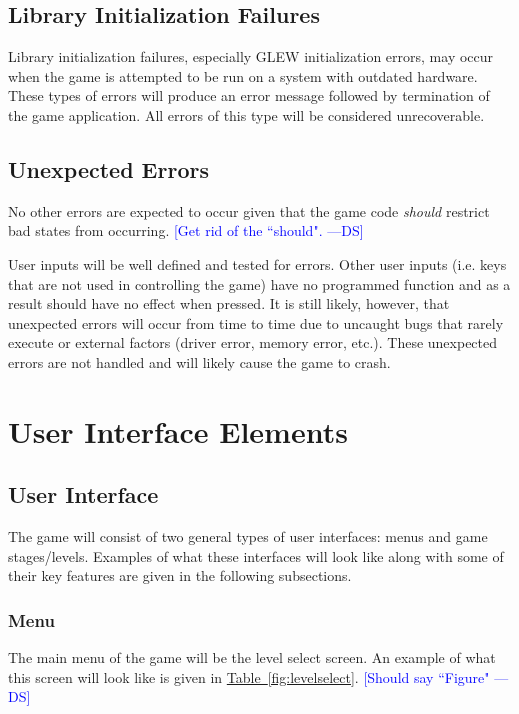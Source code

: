 \documentclass[12pt, titlepage]{article}
\newcommand{\authornote}[3]{\textcolor{#1}{[#3 ---#2]}}
\newcommand{\authornote}[3]{}
\newcommand{\ds}[1]{\authornote{blue}{DS}{#1}}
\begin{document}
\subsection{Library Initialization Failures}
Library initialization failures, especially GLEW initialization errors, may occur when the game is attempted to be run on a system with outdated hardware.  These types of errors will produce an error message followed by termination of the game application.  All errors of this type will be considered unrecoverable.

\subsection{Unexpected Errors}
No other errors are expected to occur given that the game code \emph{should} restrict bad states from occurring. 
\ds{Get rid of the ``should".}

 User inputs will be well defined and tested for errors.  Other user inputs (i.e. keys that are not used in controlling the game) have no programmed function and as a result should have no effect when pressed.  It is still likely, however, that unexpected errors will occur from time to time due to uncaught bugs that rarely execute or external factors (driver error, memory error, etc.).  These unexpected errors are not handled and will likely cause the game to crash.

\section{User Interface Elements}

\subsection{User Interface}
The game will consist of two general types of user interfaces:  menus and game stages/levels.  Examples of what these interfaces will look like along with some of their key features are given in the following subsections.

\subsubsection{Menu}
The main menu of the game will be the level select screen.  An example of what this screen will look like is given in  \hyperref[fig:levelselect]{Table~\ref*{fig:levelselect}}. \ds{Should say ``Figure"}

\newpage
\end{document}
